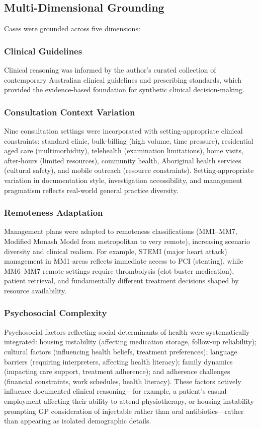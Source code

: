 \documentclass[11pt]{article}
\begin{document}
\subsection{Multi-Dimensional Grounding}

Cases were grounded across five dimensions:

\subsubsection{Clinical Guidelines}
Clinical reasoning was informed by the author's curated collection of contemporary Australian clinical guidelines and prescribing standards, which provided the evidence-based foundation for synthetic clinical decision-making.

\subsubsection{Consultation Context Variation}
Nine consultation settings were incorporated with setting-appropriate clinical constraints: standard clinic, bulk-billing (high volume, time pressure), residential aged care (multimorbidity), telehealth (examination limitations), home visits, after-hours (limited resources), community health, Aboriginal health services (cultural safety), and mobile outreach (resource constraints). Setting-appropriate variation in documentation style, investigation accessibility, and management pragmatism reflects real-world general practice diversity.

\subsubsection{Remoteness Adaptation}
Management plans were adapted to remoteness classifications (MM1--MM7, Modified Monash Model from metropolitan to very remote), increasing scenario diversity and clinical realism. For example, STEMI (major heart attack) management in MM1 areas reflects immediate access to PCI (stenting), while MM6--MM7 remote settings require thrombolysis (clot buster medication), patient retrieval, and fundamentally different treatment decisions shaped by resource availability.

\subsubsection{Psychosocial Complexity}
Psychosocial factors reflecting social determinants of health were systematically integrated: housing instability (affecting medication storage, follow-up reliability); cultural factors (influencing health beliefs, treatment preferences); language barriers (requiring interpreters, affecting health literacy); family dynamics (impacting care support, treatment adherence); and adherence challenges (financial constraints, work schedules, health literacy). These factors actively influence documented clinical reasoning—for example, a patient's casual employment affecting their ability to attend physiotherapy, or housing instability prompting GP consideration of injectable rather than oral antibiotics—rather than appearing as isolated demographic details.
\end{document}
